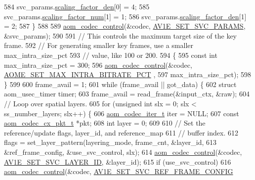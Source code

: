 \begin{DoxyCodeInclude}
{{{{{{{{{{{{{{{{{{584     svc\_params.\hyperlink{structaom__svc__params_a89c964e4a3e25c4c76bb20242bee3f6b}{scaling\_factor\_den}[0] = 4;
585     svc\_params.\hyperlink{structaom__svc__params_af29066b136efb3837dfc674d2bcc60f2}{scaling\_factor\_num}[1] = 1;
586     svc\_params.\hyperlink{structaom__svc__params_a89c964e4a3e25c4c76bb20242bee3f6b}{scaling\_factor\_den}[1] = 2;
587   \}
588 
589   \hyperlink{group__codec_ga6da974f4eeaba1fa74106b28d0fe6ac5}{aom\_codec\_control}(&codec, \hyperlink{group__aom__encoder_ggae78dde67a6d78f332e9bdba0dde42db5a94c12c49cd70d86651136ec37230d719}{AV1E\_SET\_SVC\_PARAMS}, &svc\_params);
590 
591   \textcolor{comment}{// This controls the maximum target size of the key frame.}
592   \textcolor{comment}{// For generating smaller key frames, use a smaller max\_intra\_size\_pct}
593   \textcolor{comment}{// value, like 100 or 200.}
594   \{
595     \textcolor{keyword}{const} \textcolor{keywordtype}{int} max\_intra\_size\_pct = 300;
596     \hyperlink{group__codec_ga6da974f4eeaba1fa74106b28d0fe6ac5}{aom\_codec\_control}(&codec, \hyperlink{group__aom__encoder_ggae78dde67a6d78f332e9bdba0dde42db5a9e1965ffa40d2d87556b65748c63adcc}{AOME\_SET\_MAX\_INTRA\_BITRATE\_PCT}
      ,
597                       max\_intra\_size\_pct);
598   \}
599 
600   frame\_avail = 1;
601   \textcolor{keywordflow}{while} (frame\_avail || got\_data) \{
602     \textcolor{keyword}{struct }aom\_usec\_timer timer;
603     frame\_avail = read\_frame(&input\_ctx, &raw);
604     \textcolor{comment}{// Loop over spatial layers.}
605     \textcolor{keywordflow}{for} (\textcolor{keywordtype}{unsigned} \textcolor{keywordtype}{int} slx = 0; slx < ss\_number\_layers; slx++) \{
606       \hyperlink{group__codec_gadf9e173c9e02788a9999399edab20a02}{aom\_codec\_iter\_t} iter = NULL;
607       \textcolor{keyword}{const} \hyperlink{structaom__codec__cx__pkt}{aom\_codec\_cx\_pkt\_t} *pkt;
608       \textcolor{keywordtype}{int} layer = 0;
609 
610       \textcolor{comment}{// Set the reference/update flags, layer\_id, and reference\_map}
611       \textcolor{comment}{// buffer index.}
612       flags = set\_layer\_pattern(layering\_mode, frame\_cnt, &layer\_id,
613                                 &ref\_frame\_config, &use\_svc\_control, slx);
614       \hyperlink{group__codec_ga6da974f4eeaba1fa74106b28d0fe6ac5}{aom\_codec\_control}(&codec, \hyperlink{group__aom__encoder_ggae78dde67a6d78f332e9bdba0dde42db5a1d968f9cc0ad869e36680328b0badaf7}{AV1E\_SET\_SVC\_LAYER\_ID}, &layer\_id);
615       \textcolor{keywordflow}{if} (use\_svc\_control)
616         \hyperlink{group__codec_ga6da974f4eeaba1fa74106b28d0fe6ac5}{aom\_codec\_control}(&codec, \hyperlink{group__aom__encoder_ggae78dde67a6d78f332e9bdba0dde42db5a24a2e10051709d0684d8b7acfbf988c9}{AV1E\_SET\_SVC\_REF\_FRAME\_CONFIG}
}}}}}}}}}}}}}}}}}}
\end{DoxyCodeInclude}
